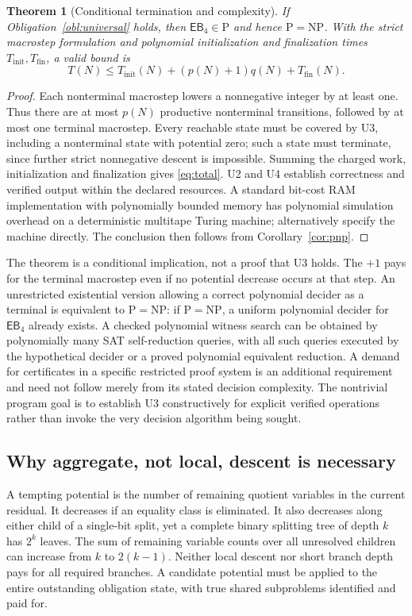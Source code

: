 \documentclass[11pt,letterpaper]{article}
\newtheorem{theorem}{Theorem}[section]
\theoremstyle{definition}
\newcommand{\EB}{\ensuremath{\mathsf{EB}_4}}
\begin{document}
\begin{theorem}[Conditional termination and complexity]\label{thm:conditional}
If Obligation~\ref{obl:universal} holds, then \(\EB\in\mathrm P\) and hence \(\mathrm P=\mathrm{NP}\). With the strict macrostep formulation and polynomial initialization and finalization times \(T_{\mathrm{init}},T_{\mathrm{fin}}\), a valid bound is
\begin{equation}\label{eq:total}
 T(N)\le T_{\mathrm{init}}(N)+(p(N)+1)q(N)+T_{\mathrm{fin}}(N).
\end{equation}
\end{theorem}
\begin{proof}
Each nonterminal macrostep lowers a nonnegative integer by at least one. Thus there are at most \(p(N)\) productive nonterminal transitions, followed by at most one terminal macrostep. Every reachable state must be covered by U3, including a nonterminal state with potential zero; such a state must terminate, since further strict nonnegative descent is impossible. Summing the charged work, initialization and finalization gives \eqref{eq:total}. U2 and U4 establish correctness and verified output within the declared resources. A standard bit-cost RAM implementation with polynomially bounded memory has polynomial simulation overhead on a deterministic multitape Turing machine; alternatively specify the machine directly. The conclusion then follows from Corollary~\ref{cor:pnp}.
\end{proof}
The theorem is a conditional implication, not a proof that U3 holds. The $+1$ pays for the terminal macrostep even if no potential decrease occurs at that step. An unrestricted existential version allowing a correct polynomial decider as a terminal is equivalent to \(\mathrm P=\mathrm{NP}\): if \(\mathrm P=\mathrm{NP}\), a uniform polynomial decider for \(\EB\) already exists. A checked polynomial witness search can be obtained by polynomially many SAT self-reduction queries, with all such queries executed by the hypothetical decider or a proved polynomial equivalent reduction. A demand for certificates in a specific restricted proof system is an additional requirement and need not follow merely from its stated decision complexity. The nontrivial program goal is to establish U3 constructively for explicit verified operations rather than invoke the very decision algorithm being sought.

\subsection{Why aggregate, not local, descent is necessary}
A tempting potential is the number of remaining quotient variables in the current residual. It decreases if an equality class is eliminated. It also decreases along either child of a single-bit split, yet a complete binary splitting tree of depth \(k\) has \(2^k\) leaves. The sum of remaining variable counts over all unresolved children can increase from \(k\) to \(2(k-1)\). Neither local descent nor short branch depth pays for all required branches. A candidate potential must be applied to the entire outstanding obligation state, with true shared subproblems identified and paid for.
\end{document}
